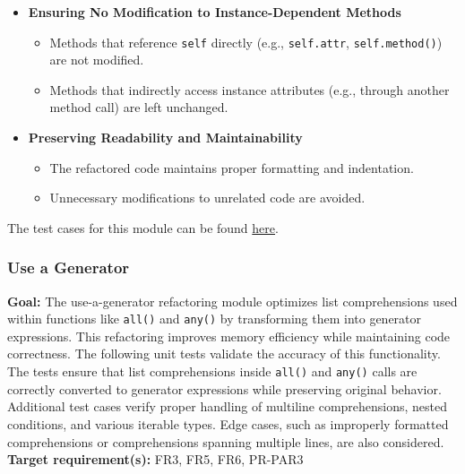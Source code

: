 \documentclass[12pt, titlepage]{article}
\begin{document}
\begin{enumerate}[label={\bf \textcolor{Maroon}{test-SRT-\arabic*}}, wide=0pt, font=\itshape]
\begin{itemize}
    \item \textbf{Ensuring No Modification to Instance-Dependent Methods}
    \begin{itemize}
        \item Methods that reference \texttt{self} directly (e.g., \texttt{self.attr}, \texttt{self.method()}) are not modified.
        \item Methods that indirectly access instance attributes (e.g., through another method call) are left unchanged.
    \end{itemize}

    \item \textbf{Preserving Readability and Maintainability}
    \begin{itemize}
        \item The refactored code maintains proper formatting and indentation.
        \item Unnecessary modifications to unrelated code are avoided.
    \end{itemize}
\end{itemize}

\noindent The test cases for this module can be found \href{https://github.com/ssm-lab/capstone--source-code-optimizer/blob/new-poc/tests/refactorers/test_member_ignoring_method.py}{here}.

\subsubsection{Use a Generator}

\textbf{Goal:} The use-a-generator refactoring module optimizes list comprehensions used within functions like \texttt{all()} and \texttt{any()} by transforming them into generator expressions. This refactoring improves memory efficiency while maintaining code correctness. The following unit tests validate the accuracy of this functionality.\\

\noindent The tests ensure that list comprehensions inside \texttt{all()} and \texttt{any()} calls are correctly converted to generator expressions while preserving original behavior. Additional test cases verify proper handling of multiline comprehensions, nested conditions, and various iterable types. Edge cases, such as improperly formatted comprehensions or comprehensions spanning multiple lines, are also considered.\\

\noindent \textbf{Target requirement(s):} FR3, FR5, FR6, PR-PAR3~\cite{SRS} \\


\end{enumerate}
\end{document}
